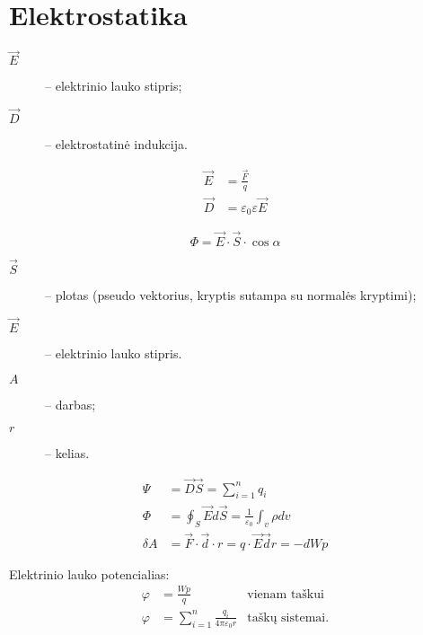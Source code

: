 \chapter{Elektrostatika}

\begin{description}
  \item[$\vec{E}$] – elektrinio lauko stipris;
  \item[$\vec{D}$] – elektrostatinė indukcija.
\end{description}

\begin{align*}
  \vec{E} &= \frac{\vec{F}}{q} \\
  \vec{D} &= \varepsilon_{0} \varepsilon \vec{E}
\end{align*}

\begin{defn}[srautas]
  \begin{equation}
    \Phi = \vec{E} \cdot \vec{S} \cdot \cos \alpha
    \label{def:srautas}
  \end{equation}
  \begin{description}
    \item[$\vec{S}$] – plotas (pseudo vektorius, kryptis sutampa su
      normalės kryptimi);
    \item[$\vec{E}$] – elektrinio lauko stipris.
  \end{description}
\end{defn}

\begin{description}
  \item[$A$] – darbas;
  \item[$r$] – kelias.
\end{description}

\begin{align*}
  \Psi &= \vec{D} \vec{S} = \sum _{i=1} ^{n} q_{i} \\
  \Phi &= \oint_{S} \vec{E} d \vec{S} = 
    \frac{1}{\varepsilon_{0}} \int _{v} \rho dv \\
  \delta A &= \vec{F} \cdot \vec{d} \cdot r =
    q \cdot \vec{E} \vec{d} r = -d W p
\end{align*}

Elektrinio lauko potencialias:
\begin{align*}
  \varphi &= \frac{Wp}{q} & \text{vienam taškui} \\
  \varphi &= \sum ^{n} _{i=1} \frac{q_{i}}{4 \pi \varepsilon_{0} r} 
    & \text{taškų sistemai}.
\end{align*}

